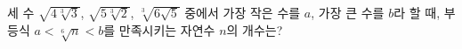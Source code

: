 세 수 $\sqrt{4\sqrt[3]{3}}$, $\sqrt{5\sqrt[3]{2}}$, $\sqrt[3]{6\sqrt{5}}$ 중에서 가장 작은 수를 $a$, 가장 큰 수를 $b$라 할 때, 부등식 $a<\sqrt[6]{n}<b$를 만족시키는 자연수 $n$의 개수는?
